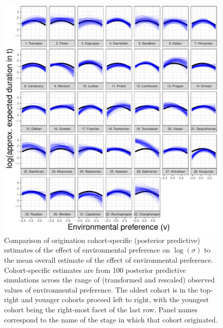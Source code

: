 \documentclass[11pt]{article}
\begin{document}
\begin{figure}[ht]
  \centering
  \includegraphics[width = \textwidth,height = 0.8\textheight,keepaspectratio=true]{figure/env_cohort_med_cweib_base}
  \caption{Comparison of origination cohort-specific (posterior predictive) estimates of the effect of environmental preference on \(\log(\sigma)\) to the mean overall estimate of the effect of environmental preference. Cohort-specific estimates are from 100 posterior predictive simulations across the range of (transformed and rescaled) observed values of environmental preference. The oldest cohort is in the top-right and younger cohorts proceed left to right, with the youngest cohort being the right-most facet of the last row. Panel names correspond to the name of the stage in which that cohort originated.}
  \label{fig:env_cohort}
\end{figure}
\end{document}
